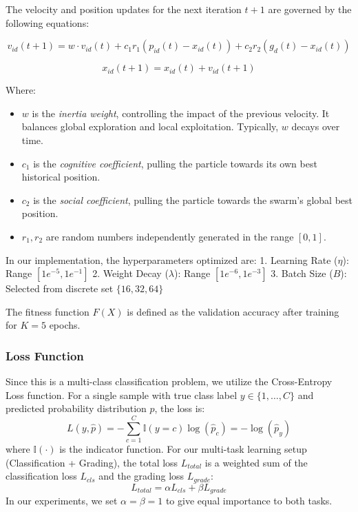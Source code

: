 \documentclass[12pt, a4paper]{article}
\begin{document}
The velocity and position updates for the next iteration $t+1$ are governed by the following equations:

\begin{equation}
v_{id}(t+1) = w \cdot v_{id}(t) + c_1 r_1 (p_{id}(t) - x_{id}(t)) + c_2 r_2 (g_{d}(t) - x_{id}(t))
\end{equation}

\begin{equation}
x_{id}(t+1) = x_{id}(t) + v_{id}(t+1)
\end{equation}

Where:
\begin{itemize}
    \item $w$ is the \textit{inertia weight}, controlling the impact of the previous velocity. It balances global exploration and local exploitation. Typically, $w$ decays over time.
    \item $c_1$ is the \textit{cognitive coefficient}, pulling the particle towards its own best historical position.
    \item $c_2$ is the \textit{social coefficient}, pulling the particle towards the swarm's global best position.
    \item $r_1, r_2$ are random numbers independently generated in the range $[0, 1]$.
\end{itemize}

In our implementation, the hyperparameters optimized are:
1. Learning Rate ($\eta$): Range $[1e^{-5}, 1e^{-1}]$
2. Weight Decay ($\lambda$): Range $[1e^{-6}, 1e^{-3}]$
3. Batch Size ($B$): Selected from discrete set $\{16, 32, 64\}$

The fitness function $F(X)$ is defined as the validation accuracy after training for $K=5$ epochs.

\subsubsection{Loss Function}
Since this is a multi-class classification problem, we utilize the Cross-Entropy Loss function. For a single sample with true class label $y \in \{1, \dots, C\}$ and predicted probability distribution $\hat{p}$, the loss is:
\begin{equation}
L(y, \hat{p}) = - \sum_{c=1}^{C} \mathbb{I}(y=c) \log(\hat{p}_c) = - \log(\hat{p}_y)
\end{equation}
where $\mathbb{I}(\cdot)$ is the indicator function.
For our multi-task learning setup (Classification + Grading), the total loss $L_{total}$ is a weighted sum of the classification loss $L_{cls}$ and the grading loss $L_{grade}$:
\begin{equation}
L_{total} = \alpha L_{cls} + \beta L_{grade}
\end{equation}
In our experiments, we set $\alpha = \beta = 1$ to give equal importance to both tasks.
\end{document}
